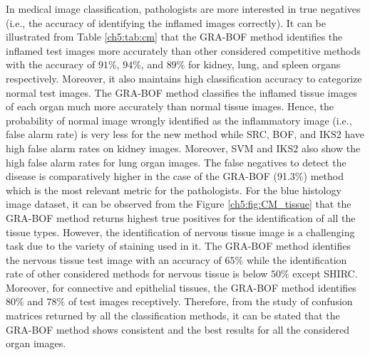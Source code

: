 In medical image classification, pathologists are more interested in true negatives (i.e., the accuracy of identifying the inflamed images correctly). It can be illustrated from Table \ref{ch5:tab:cm} that the GRA-BOF method identifies the inflamed test images more accurately than other considered competitive methods with the accuracy of $91\%$, $94\%$, and $89\%$ for kidney, lung, and spleen organs respectively. Moreover, it also maintains high classification accuracy to categorize normal test images. The GRA-BOF method classifies the inflamed tissue images of each organ much more accurately than normal tissue images. Hence, the probability of normal image wrongly identified as the inflammatory image (i.e., false alarm rate) is very less for the new method while SRC, BOF, and IKS2 have high false alarm rates on kidney images. Moreover, SVM and IKS2 also show the high false alarm rates for lung organ images. The false negatives to detect the disease is comparatively higher in the case of the GRA-BOF (91.3\%) method which is the most relevant metric for the pathologists. For the blue histology image dataset, it can be observed from the Figure \ref{ch5:fig:CM_tissue} that the GRA-BOF method returns highest true positives for the identification of all the tissue types. However, the identification of nervous tissue image is a challenging task due to the variety of staining used in it. The GRA-BOF method identifies the nervous tissue test image with an accuracy of $65\%$ while the identification rate of other considered methods for nervous tissue is below $50\%$ except SHIRC. Moreover, for connective and epithelial tissues, the GRA-BOF method identifies $80\%$ and $78\%$ of test images receptively. Therefore, from the study of confusion matrices returned by all the classification methods, it can be stated that the GRA-BOF method shows consistent and the best results for all the considered organ images.   

